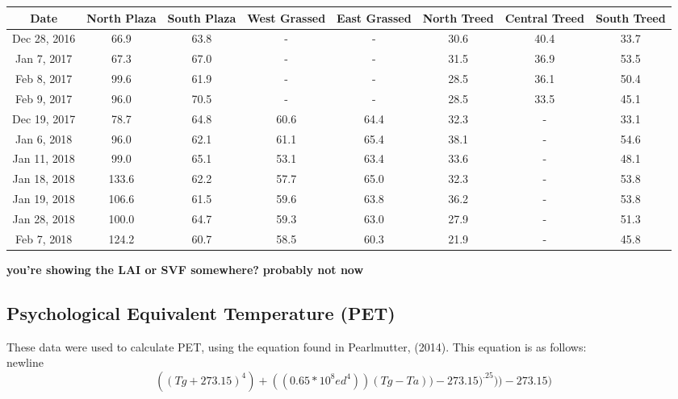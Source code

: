 \documentclass[twocolumn, a4paper]{article}
\providecommand{\comment}[1]{{\large\bf #1}}
\begin{document}
\begin{table}
	\begin{tabular}{|c||c|c|c|c|c|c|c|}
	\hline 
	 Date & North Plaza & South Plaza & West Grassed & East Grassed & North Treed & Central Treed & South Treed \\ 
	\hline 
	Dec 28, 2016 & 66.9 & 63.8 & - & - & 30.6 & 40.4 &  33.7 \\ 
	\hline 
	Jan 7, 2017 & 67.3 & 67.0 & - & - & 31.5 & 36.9 & 53.5 \\ 
	\hline 
	Feb 8, 2017 & 99.6 & 61.9 & - & - & 28.5 & 36.1 & 50.4 \\ 
	\hline 
	Feb 9, 2017 & 96.0 & 70.5 & - & - & 28.5 & 33.5 & 45.1 \\ 
	\hline 
	Dec 19, 2017 & 78.7 & 64.8 & 60.6 & 64.4 & 32.3 & - & 33.1 \\ 
	\hline 
	Jan 6, 2018 & 96.0 & 62.1 & 61.1 & 65.4 & 38.1 & - & 54.6 \\ 
	\hline 
	Jan 11, 2018 & 99.0 & 65.1 & 53.1 & 63.4 & 33.6 & - & 48.1 \\ 
	\hline 
	Jan 18, 2018 & 133.6 & 62.2 & 57.7 & 65.0 & 32.3 & - & 53.8 \\ 
	\hline 
	Jan 19, 2018 & 106.6 & 61.5 & 59.6 & 63.8 & 36.2 & - & 53.8 \\ 
	\hline 
	Jan 28, 2018 & 100.0 & 64.7 & 59.3 & 63.0 & 27.9 & - & 51.3 \\ 
	\hline 
	Feb 7, 2018 & 124.2 & 60.7 & 58.5 & 60.3 & 21.9 & - & 45.8 \\ 
	\hline 
\end{tabular} 
      \end{table}
\twocolumn


\comment{you're showing the LAI or SVF somewhere?}
\comment{probably not now}

\subsection{Psychological Equivalent Temperature (PET)}
These data were used to calculate PET, using the equation found in Pearlmutter, (2014).
This equation is as follows:
\\newline
\begin{equation*}
  ((Tg + 273.15)^4) + ((0.65*10^8e
    d^4))(Tg - Ta)) - 273.15)^.25))-273.15)
        \end{equation*}
\end{document}
